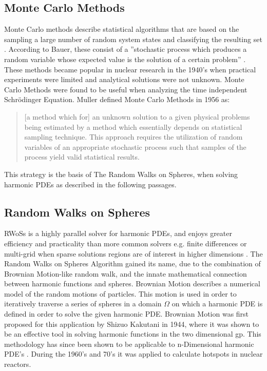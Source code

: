 \subsection{Monte Carlo Methods}\label{ssec:montecarlo}
Monte Carlo methods describe statistical algorithms that are based on the sampling a
large number of random system states and classifying the resulting set \cite{Metropolis}.
According to Bauer, these consist of a ''stochastic process which produces a random variable
 whose expected value is the solution of a certain problem'' \cite{bauer}.
These methods became popular in nuclear research in the 1940's when practical
experiments were limited and analytical solutions were not unknown.  Monte Carlo
Methods were found to be useful when analyzing the time independent Schrödinger
Equation\cite{Metropolis}. Muller defined Monte Carlo Methods in 1956 as:
\begin{quote}[a method which for] an unknown solution to a given physical
problems being estimated by a method which essentially depends on statistical sampling technique.
This approach requires the utilization of random variables of an appropriate
stochastic process such that samples of the process yield valid statistical
results\cite{Muller}.\end{quote}
This strategy is the basis of The Random Walks on Spheres, when solving harmonic
\Glspl{PDE} as described in the following passages.
\subsection{Random Walks on Spheres}\label{ssec:RWoS}
 \Glspl{RWoS} is a highly parallel solver for harmonic \Glspl{PDE},
and enjoys greater efficiency and practicality than more common solvers e.g.
finite differences or multi-grid when sparse solutions regions are of
interest in higher dimensions \cite{DeLaurentis}\cite{Bornemann}\cite{Yang}.
The Random Walks on Spheres Algorithm
gained its name, due to the combination of Brownian Motion-like random walk,
and the innate mathematical connection between
harmonic functions and spheres\cite{Axler1992}.
Brownian Motion describes a numerical model
of the random motions of particles.  This motion is used in order to iteratively
traverse a series %
of spheres in a domain $\Omega$ on which a harmonic PDE is defined in order to %
solve the given harmonic PDE\cite{DeLaurentis}.
Brownian Motion
was first
proposed for this application by Shizuo Kakutani in 1944\cite{kakutani},
where it was shown to be an effective tool
in solving harmonic functions in the two dimensional \Gls{gp}.  This methodology has since been
shown to be applicable to n-Dimensional harmonic PDE's \cite{DeLaurentis}.  During the 1960's
and 70's it was applied to calculate hotspots in nuclear reactors\cite{Bornemann}.

